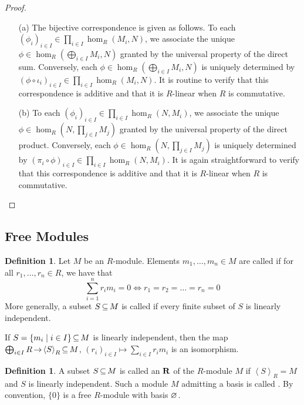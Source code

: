 \documentclass[11pt]{book}
\theoremstyle{definition}   \newtheorem{defn}[counter]{Definition} %
\newtheorem*{defn*}{Definition}
\newcommand{\gen}[1]{\left\langle #1 \right\rangle}   \newcommand{\stab}[2]{\tn{Stab}_{#1}(#2)}   \newcommand{\fix}[2]{\tn{Fix}_{#1}(#2)}   \newcommand{\op}{^{\tn{op}}}
\DeclareMathOperator{\ra}{\rightarrow}   \DeclareMathOperator{\Poly}{\mathbf{P}}   \DeclareMathOperator{\spn}{\textnormal{span}}   \DeclareMathOperator{\aut}{\textnormal{Aut}}
\newcommand{\vs}{\vspace{8pt}}   \newcommand{\hs}{\hspace{8pt}}
\numberwithin{counter}{chapter}
\begin{document}
\begin{proof}\
\begin{enumerate}
\item[(a)] The bijective correspondence is given as follows. To each $(\phi_i)_{i \in I} \in \prod_{i \in I} \hom_R(M_i,N)$, we associate the unique $\phi \in \hom_R(\bigoplus_{i \in I} M_i,N)$ granted by the universal property of the direct sum. Conversely, each $\phi \in \hom_R(\bigoplus_{i \in I} M_i,N)$ is uniquely determined by $(\phi \circ \iota_i)_{i \in I} \in \prod_{i \in I} \hom_R(M_i,N)$. It is routine to verify that this correspondence is additive and that it is $R$-linear when $R$ is commutative.

\item[(b)] To each $(\phi_i)_{i \in I} \in \prod_{i \in I} \hom_R(N,M_i)$, we associate the unique $\phi \in \hom_R(N,\prod_{j \in I} M_j)$ granted by the universal property of the direct product. Conversely, each $\phi \in  \hom_R(N,\prod_{j \in I} M_j)$ is uniquely determined by $(\pi_i \circ \phi)_{i \in I} \in \prod_{i \in I} \hom_R(N,M_i)$. It is again straightforward to verify that this correspondence is additive and that it is $R$-linear when $R$ is commutative.
\end{enumerate}
\end{proof}

\vs

\subsection*{Free Modules}

\vs

\begin{defn*}
Let $M$ be an $R$-module. Elements $m_1,\dots,m_n \in M$ are called  if for all $r_1,\dots,r_n \in R$, we have that
	\[\sum_{i = 1}^n r_i m_i = 0 \iff r_1 = r_2 = \dots = r_n = 0 \]
More generally, a subset $S \operatorname{\subseteq} M$ is called  if every finite subset of $S$ is linearly independent.
\end{defn*}

\vs

\begin{remark}
If $S = \{m_i \mid i \in I\} \operatorname{\subseteq} M$ is linearly independent, then the map $\bigoplus_{i \in I} R \ra \gen{S}_R \sub M$, $(r_i)_{i \in I} \mapsto \sum_{i \in I} r_i m_i$ is an isomorphism.
\end{remark}

\vs

\begin{defn}
A subset $S \operatorname{\subseteq} M$ is called an $\mathbf{R}$ of the $R$-module $M$ if $\gen{S}_R = M$ and $S$ is linearly independent. Such a module $M$ admitting a basis is called . By convention, $\{0\}$ is a free $R$-module with basis $\varnothing$.
\end{defn}
\end{document}
